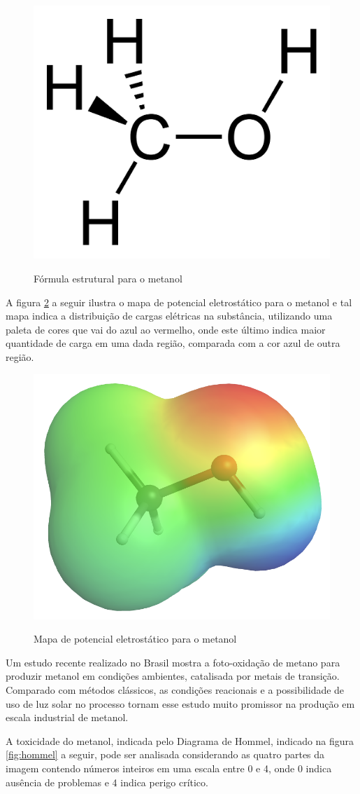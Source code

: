 \begin{figure}[h]
    \centering
    \caption{Fórmula estrutural para o metanol}
    \vspace{0.5cm}
    \includegraphics[width=0.2\linewidth]{imagens/methanol-2d-0349e4-1024.png}
\label{fig:mpemetanol}
\end{figure}

A figura \ref{fig:mpemetanol} a seguir ilustra o mapa de potencial eletrostático para o metanol e tal mapa indica a distribuição de cargas elétricas na substância, utilizando uma paleta de cores que vai do azul ao vermelho, onde este último indica maior quantidade de carga em uma dada região, comparada com a cor azul de outra região.

\begin{figure}[h]
    \centering
    \caption{Mapa de potencial eletrostático para o metanol}
    \vspace{0.5cm}
    \includegraphics[width=0.45\linewidth]{imagens/mpemetanol.png}
\label{fig:mpemetanol}
\end{figure}

Um estudo recente realizado no Brasil \cite{D2CC01757A} mostra a foto-oxidação de metano para produzir metanol em condições ambientes, catalisada por metais de transição. Comparado com métodos clássicos, as condições reacionais e a possibilidade de uso de luz solar no processo tornam esse estudo muito promissor na produção em escala industrial de metanol.

A toxicidade do metanol, indicada pelo Diagrama de Hommel, indicado na figura \ref{fig:hommel} a seguir, pode ser analisada considerando as quatro partes da imagem contendo números inteiros em uma escala entre 0 e 4, onde 0 indica ausência de problemas e 4 indica perigo crítico.


